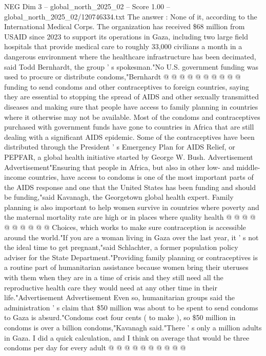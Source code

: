 \begin{textsample}{NEG Dim 3 – global\_north\_2025\_02 – Score 1.00 – global\_north\_2025\_02/120746334.txt}
The answer : None of it, according to the International Medical Corps.
The organization has received \$68 million from USAID since 2023 to support its operations in Gaza, including two large field hospitals that provide medical care to roughly 33,000 civilians a month in a dangerous environment where the healthcare infrastructure has been decimated, said Todd Bernhardt, the group ' s spokesman."No U.S. government funding was used to procure or distribute condoms,"Bernhardt @ @ @ @ @ @ @ @ @ @ funding to send condoms and other contraceptives to foreign countries, saying they are essential to stopping the spread of AIDS and other sexually transmitted diseases and making sure that people have access to family planning in countries where it otherwise may not be available.
Most of the condoms and contraceptives purchased with government funds have gone to countries in Africa that are still dealing with a significant AIDS epidemic.
Some of the contraceptives have been distributed through the President ' s Emergency Plan for AIDS Relief, or PEPFAR, a global health initiative started by George W.
Bush.
Advertisement Advertisement"Ensuring that people in Africa, but also in other low- and middle-income countries, have access to condoms is one of the most important parts of the AIDS response and one that the United States has been funding and should be funding,"said Kavanagh, the Georgetown global health expert.
Family planning is also important to help women survive in countries where poverty and the maternal mortality rate are high or in places where quality health @ @ @ @ @ @ @ @ @ @ Choices, which works to make sure contraception is accessible around the world."If you are a woman living in Gaza over the last year, it ' s not the ideal time to get pregnant,"said Schlachter, a former population policy adviser for the State Department."Providing family planning or contraceptives is a routine part of humanitarian assistance because women bring their uteruses with them when they are in a time of crisis and they still need all the reproductive health care they would need at any other time in their life."Advertisement Advertisement Even so, humanitarian groups said the administration ' s claim that \$50 million was about to be spent to send condoms to Gaza is absurd."Condoms cost four cents ( to make ), so \$50 million in condoms is over a billion condoms,"Kavanagh said."There ' s only a million adults in Gaza.
I did a quick calculation, and I think on average that would be three condoms per day for every adult @ @ @ @ @ @ @ @ @ @

\end{textsample}

